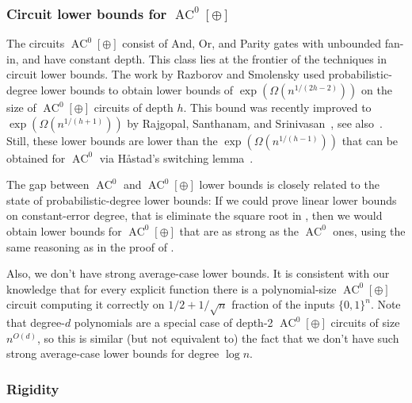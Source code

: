 \documentclass{toc}
\DeclareMathOperator{\AC}{\mathrm{AC}}  %
\newcommand{\zo}{\{0, 1\}}
\begin{document}
%
\subsubsection{Circuit lower bounds for \texorpdfstring{$\AC^{0}[\oplus]$}{AC0(+)}}

The circuits $\AC^{0}[\oplus]$ consist of And, Or, and Parity gates
with unbounded fan-in, and have constant depth. This class lies at
the frontier of the techniques in circuit lower bounds. The
%
%
work  %
by Razborov and Smolensky used probabilistic-degree lower bounds to
obtain lower bounds of $\exp(\Omega(n^{1/(2h-2)}))$ on the size of
$\AC^{0}[\oplus]$ circuits of depth $h$. This bound was recently
improved to $\exp(\Omega(n^{1/(h+1)}))$ by Rajgopal, Santhanam, and
Srinivasan~\cite{DBLP:conf/mfcs/RajgopalS018}, see 
also~\cite{DBLP:conf/coco/OliveiraS019}.
Still, these lower bounds are lower than the $\exp(\Omega(n^{1/(h-1)}))$
that can be obtained for $\AC^{0}$ via
%
%
H{\aa}stad's switching lemma~\cite{Has87}.  %

The gap between $\AC^{0}$ and $\AC^{0}[\oplus]$ lower bounds is closely
related to the state of probabilistic-degree lower bounds: If we could
prove linear lower bounds on constant-error degree, that is eliminate
the square root in 
, %
then we would obtain lower
bounds for $\AC^{0}[\oplus]$ that are as strong as the $\AC^{0}$ ones,
using the same reasoning
as  %
in the proof of .

Also, we don't have strong average-case lower bounds. It is consistent
with our knowledge that for every explicit function there is a polynomial-size
$\AC^{0}[\oplus]$ circuit computing it correctly on $1/2+1/\sqrt{n}$
fraction of the inputs $\zo^{n}$. Note that degree-$d$ polynomials
are a special case of depth-2 $\AC^{0}[\oplus]$ circuits of size $n^{O(d)}$,
so this is similar (but not equivalent to) the fact that we don't
have such strong average-case lower bounds for degree $\log n$.

\subsubsection{Rigidity}
\label{sec:rigidity}   %
\end{document}
